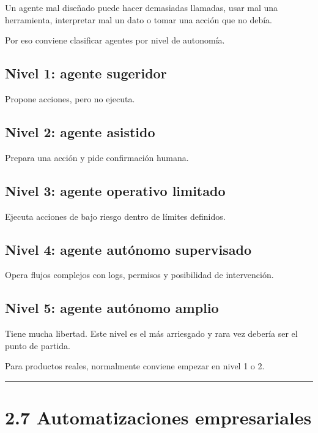 Un agente mal diseñado puede hacer demasiadas llamadas, usar mal una
herramienta, interpretar mal un dato o tomar una acción que no debía.

Por eso conviene clasificar agentes por nivel de autonomía.

\subsection{Nivel 1: agente sugeridor}\label{nivel-1-agente-sugeridor}

Propone acciones, pero no ejecuta.

\subsection{Nivel 2: agente asistido}\label{nivel-2-agente-asistido}

Prepara una acción y pide confirmación humana.

\subsection{Nivel 3: agente operativo
limitado}\label{nivel-3-agente-operativo-limitado}

Ejecuta acciones de bajo riesgo dentro de límites definidos.

\subsection{Nivel 4: agente autónomo
supervisado}\label{nivel-4-agente-autuxf3nomo-supervisado}

Opera flujos complejos con logs, permisos y posibilidad de intervención.

\subsection{Nivel 5: agente autónomo
amplio}\label{nivel-5-agente-autuxf3nomo-amplio}

Tiene mucha libertad. Este nivel es el más arriesgado y rara vez debería
ser el punto de partida.

Para productos reales, normalmente conviene empezar en nivel 1 o 2.

\begin{center}\rule{0.5\linewidth}{0.5pt}\end{center}

\section{2.7 Automatizaciones
empresariales}\label{automatizaciones-empresariales}

